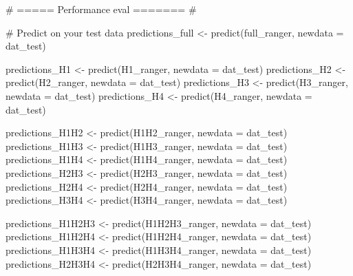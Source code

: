 \documentclass[
  letterpaper,
  DIV=11,
  numbers=noendperiod]{scrartcl}
\newenvironment{Shaded}{\begin{snugshade}}{\end{snugshade}}
\newcommand{\AttributeTok}[1]{\textcolor[rgb]{0.40,0.45,0.13}{#1}}
\newcommand{\CommentTok}[1]{\textcolor[rgb]{0.37,0.37,0.37}{#1}}
\newcommand{\FunctionTok}[1]{\textcolor[rgb]{0.28,0.35,0.67}{#1}}
\newcommand{\NormalTok}[1]{\textcolor[rgb]{0.00,0.23,0.31}{#1}}
\newcommand{\OtherTok}[1]{\textcolor[rgb]{0.00,0.23,0.31}{#1}}
\begin{document}
\begin{Shaded}
\begin{Highlighting}[]
\CommentTok{\# ===== Performance eval ======= \#}

\CommentTok{\# Predict on your test data}
\NormalTok{predictions\_full }\OtherTok{\textless{}{-}} \FunctionTok{predict}\NormalTok{(full\_ranger, }\AttributeTok{newdata =}\NormalTok{ dat\_test)}

\NormalTok{predictions\_H1 }\OtherTok{\textless{}{-}} \FunctionTok{predict}\NormalTok{(H1\_ranger, }\AttributeTok{newdata =}\NormalTok{ dat\_test)}
\NormalTok{predictions\_H2 }\OtherTok{\textless{}{-}} \FunctionTok{predict}\NormalTok{(H2\_ranger, }\AttributeTok{newdata =}\NormalTok{ dat\_test)}
\NormalTok{predictions\_H3 }\OtherTok{\textless{}{-}} \FunctionTok{predict}\NormalTok{(H3\_ranger, }\AttributeTok{newdata =}\NormalTok{ dat\_test)}
\NormalTok{predictions\_H4 }\OtherTok{\textless{}{-}} \FunctionTok{predict}\NormalTok{(H4\_ranger, }\AttributeTok{newdata =}\NormalTok{ dat\_test)}

\NormalTok{predictions\_H1H2 }\OtherTok{\textless{}{-}} \FunctionTok{predict}\NormalTok{(H1H2\_ranger, }\AttributeTok{newdata =}\NormalTok{ dat\_test)}
\NormalTok{predictions\_H1H3 }\OtherTok{\textless{}{-}} \FunctionTok{predict}\NormalTok{(H1H3\_ranger, }\AttributeTok{newdata =}\NormalTok{ dat\_test)}
\NormalTok{predictions\_H1H4 }\OtherTok{\textless{}{-}} \FunctionTok{predict}\NormalTok{(H1H4\_ranger, }\AttributeTok{newdata =}\NormalTok{ dat\_test)}
\NormalTok{predictions\_H2H3 }\OtherTok{\textless{}{-}} \FunctionTok{predict}\NormalTok{(H2H3\_ranger, }\AttributeTok{newdata =}\NormalTok{ dat\_test)}
\NormalTok{predictions\_H2H4 }\OtherTok{\textless{}{-}} \FunctionTok{predict}\NormalTok{(H2H4\_ranger, }\AttributeTok{newdata =}\NormalTok{ dat\_test)}
\NormalTok{predictions\_H3H4 }\OtherTok{\textless{}{-}} \FunctionTok{predict}\NormalTok{(H3H4\_ranger, }\AttributeTok{newdata =}\NormalTok{ dat\_test)}

\NormalTok{predictions\_H1H2H3 }\OtherTok{\textless{}{-}} \FunctionTok{predict}\NormalTok{(H1H2H3\_ranger, }\AttributeTok{newdata =}\NormalTok{ dat\_test)}
\NormalTok{predictions\_H1H2H4 }\OtherTok{\textless{}{-}} \FunctionTok{predict}\NormalTok{(H1H2H4\_ranger, }\AttributeTok{newdata =}\NormalTok{ dat\_test)}
\NormalTok{predictions\_H1H3H4 }\OtherTok{\textless{}{-}} \FunctionTok{predict}\NormalTok{(H1H3H4\_ranger, }\AttributeTok{newdata =}\NormalTok{ dat\_test)}
\NormalTok{predictions\_H2H3H4 }\OtherTok{\textless{}{-}} \FunctionTok{predict}\NormalTok{(H2H3H4\_ranger, }\AttributeTok{newdata =}\NormalTok{ dat\_test)}


\end{Highlighting}
\end{Shaded}
\end{document}
